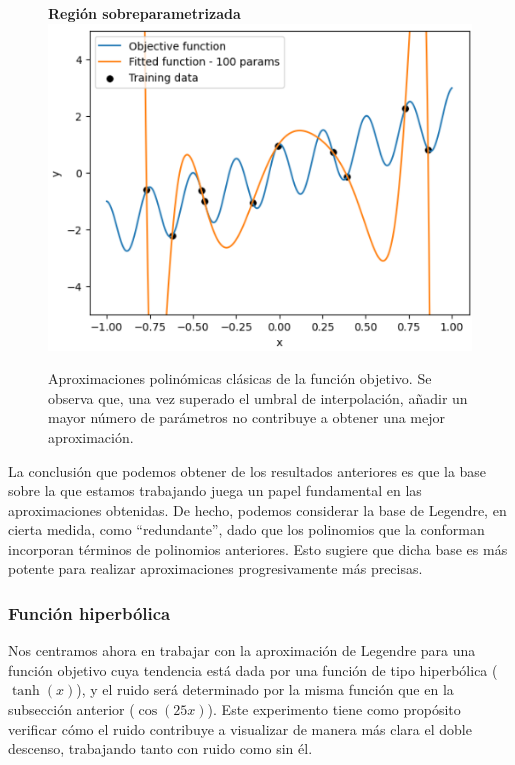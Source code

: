 \begin{figure}[h]
    \begin{minipage}{0.32\textwidth}
        \centering
        \textbf{Región sobreparametrizada} \\[0.5ex] 
        \includegraphics[width=\linewidth]{img/experiments/OLS1.3.png}
    \end{minipage}
    \caption[Aproximaciones polinómicas clásicas de la función objetivo.]{Aproximaciones polinómicas clásicas de la función objetivo. Se observa que, una vez superado el umbral de interpolación, añadir un mayor número de parámetros no contribuye a obtener una mejor aproximación.}\label{fig:polynomial1DD}
\end{figure}

La conclusión que podemos obtener de los resultados anteriores es que la base sobre la que estamos trabajando juega un papel fundamental en las aproximaciones obtenidas. De hecho, podemos considerar la base de Legendre, en cierta medida, como ``redundante'', dado que los polinomios que la conforman incorporan términos de polinomios anteriores. Esto sugiere que dicha base es más potente para realizar aproximaciones progresivamente más precisas.\newline

\subsubsection{Función hiperbólica}\label{subsubsec:funcion-hiperbolica}

Nos centramos ahora en trabajar con la aproximación de Legendre para una función objetivo cuya tendencia está dada por una función de tipo hiperbólica ($\tanh(x)$), y el ruido será determinado por la misma función que en la subsección anterior ($\cos(25x)$). Este experimento tiene como propósito verificar cómo el ruido contribuye a visualizar de manera más clara el doble descenso, trabajando tanto con ruido como sin él.\newline

